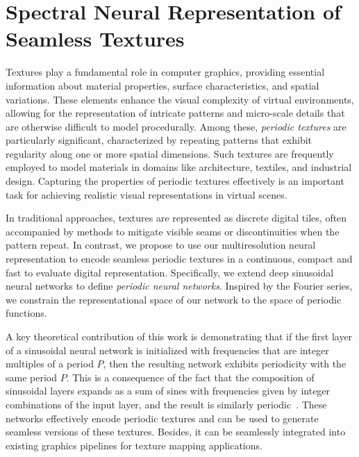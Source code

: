 \chapter{Spectral Neural Representation of Seamless Textures}
\label{chap:seamless-textures}

Textures play a fundamental role in computer graphics, providing essential information about material properties, surface characteristics, and spatial variations. These elements enhance the visual complexity of virtual environments, allowing for the representation of intricate patterns and micro-scale details that are otherwise difficult to model procedurally. Among these, \textit{periodic textures} are particularly significant, characterized by repeating patterns that exhibit regularity along one or more spatial dimensions. Such textures are frequently employed to model materials in domains like architecture, textiles, and industrial design. Capturing the properties of periodic textures effectively is an important task for achieving realistic visual representations in virtual scenes.

In traditional approaches, textures are represented as discrete digital tiles, often accompanied by methods to mitigate visible seams or discontinuities when the pattern repeat. In contrast, we propose to use our multiresolution neural representation to encode seamless periodic textures in a continuous, compact and fast to evaluate digital representation. Specifically, we extend deep sinusoidal neural networks to define \textit{periodic neural networks}. Inspired by the Fourier series, we constrain the representational space of our network to the space of periodic functions.

A key theoretical contribution of this work is demonstrating that if the first layer of a sinusoidal neural network is initialized with frequencies that are integer multiples of a period $P$, then the resulting network exhibits periodicity with the same period $P$. This is a consequence of the fact that the composition of sinusoidal layers expands as a sum of sines with frequencies given by integer combinations of the input layer, and the result is similarly periodic~\citep{novello2022understanding, yuce2022structured}. These networks effectively encode periodic textures and can be used to generate seamless versions of these textures. Besides, it can be seamlessly integrated into existing graphics pipelines for texture mapping applications.

